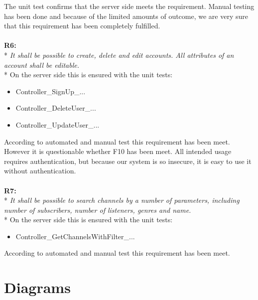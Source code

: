 \documentclass[a4paper,11pt,report]{article}
\begin{document}
The unit test confirms that the server side meets the requirement. Manual testing has been done and because of the limited amounts of outcome, we are very sure that this requirement has been completely fulfilled. \\ \\
\textbf{R6:} \\*
\textit{It shall be possible to create, delete and edit accounts. All attributes of an account shall be editable.} \\*
On the server side this is ensured with the unit tests:
\begin{itemize}
\item Controller\_SignUp\_...
\item Controller\_DeleteUser\_...
\item Controller\_UpdateUser\_...
\end{itemize}
According to automated and manual test this requirement has been meet. However it is questionable whether F10 has been meet. All intended usage requires authentication, but because our system is so insecure, it is easy to use it without authentication. \\ \\
\textbf{R7:} \\*
\textit{It shall be possible to search channels by a number of parameters, including number of subscribers, number of listeners, genres and name.} \\*
On the server side this is ensured with the unit tests:
\begin{itemize}
\item Controller\_GetChannelsWithFilter\_...
\end{itemize}
According to automated and manual test this requirement has been meet.
\newpage
\section{Diagrams}
\end{document}
